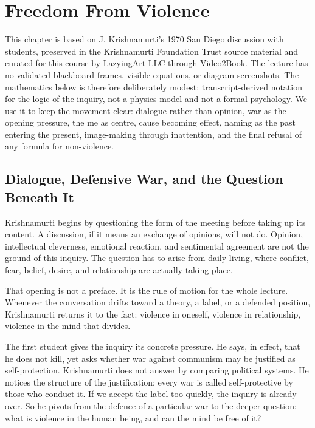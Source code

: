 \chapter{Freedom From Violence}

This chapter is based on J. Krishnamurti's 1970 San Diego discussion with students, preserved in the Krishnamurti Foundation Trust source material and curated for this course by LazyingArt LLC through Video2Book. The lecture has no validated blackboard frames, visible equations, or diagram screenshots. The mathematics below is therefore deliberately modest: transcript-derived notation for the logic of the inquiry, not a physics model and not a formal psychology. We use it to keep the movement clear: dialogue rather than opinion, war as the opening pressure, the me as centre, cause becoming effect, naming as the past entering the present, image-making through inattention, and the final refusal of any formula for non-violence.

\section{Dialogue, Defensive War, and the Question Beneath It}

Krishnamurti begins by questioning the form of the meeting before taking up its content. A discussion, if it means an exchange of opinions, will not do. Opinion, intellectual cleverness, emotional reaction, and sentimental agreement are not the ground of this inquiry. The question has to arise from daily living, where conflict, fear, belief, desire, and relationship are actually taking place.

That opening is not a preface. It is the rule of motion for the whole lecture. Whenever the conversation drifts toward a theory, a label, or a defended position, Krishnamurti returns it to the fact: violence in oneself, violence in relationship, violence in the mind that divides.

The first student gives the inquiry its concrete pressure. He says, in effect, that he does not kill, yet asks whether war against communism may be justified as self-protection. Krishnamurti does not answer by comparing political systems. He notices the structure of the justification: every war is called self-protective by those who conduct it. If we accept the label too quickly, the inquiry is already over. So he pivots from the defence of a particular war to the deeper question: what is violence in the human being, and can the mind be free of it?

